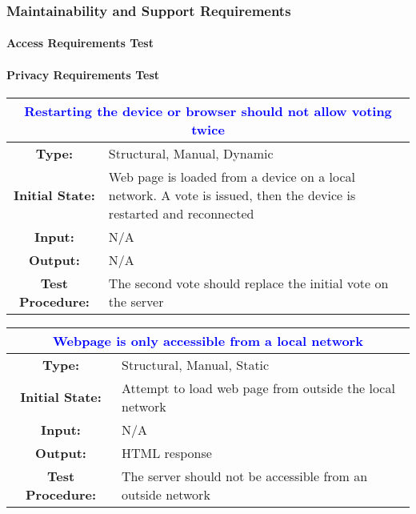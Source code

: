 \documentclass[12pt, titlepage]{article}
\begin{document}
\subsubsection{Maintainability and Support Requirements}

\paragraph{Access Requirements Test}

\paragraph{Privacy Requirements Test}

\begin{center}
\begin{table}[H]
\begin{tabularx}{\textwidth}{| c X |}
\hline
\multicolumn{2}{|c|}{\textbf{\textcolor{blue}{Restarting the device or browser should not allow voting twice}}}\\
\hline
\textbf{Type: } & Structural, Manual, Dynamic\\
\textbf{Initial State: } & Web page is loaded from a device on a local network. A vote is issued, then the device is restarted and reconnected\\
\textbf{Input: } & N/A\\
\textbf{Output: } & N/A \\
\textbf{Test Procedure:  } & The second vote should replace the initial vote on the server \\
\hline
\end{tabularx}
\end{table}
\end{center}

\begin{center}
\begin{table}[H]
\begin{tabularx}{\textwidth}{| c X |}
\hline
\multicolumn{2}{|c|}{\textbf{\textcolor{blue}{Webpage is only accessible from a local network}}}\\
\hline
\textbf{Type: } & Structural, Manual, Static\\
\textbf{Initial State: } & Attempt to load web page from outside the local network\\
\textbf{Input: } & N/A\\
\textbf{Output: } & HTML response \\
\textbf{Test Procedure:  } & The server should not be accessible from an outside network \\
\hline
\end{tabularx}
\end{table}
\end{center}
\end{document}
